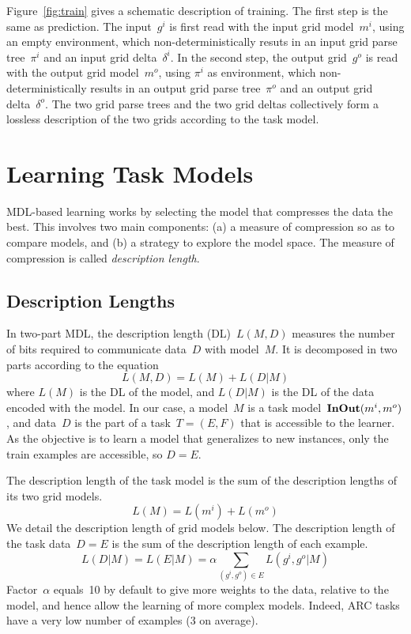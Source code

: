 \documentclass[a4paper]{llncs}
\begin{document}
Figure~\ref{fig:train} gives a schematic description of training. The
first step is the same as prediction. The input~$g^i$ is first read
with the input grid model~$m^i$, using an empty environment, which
non-deterministically resuts in an input grid parse tree~$\pi^i$ and
an input grid delta~$\delta^i$. In the second step, the output
grid~$g^o$ is read with the output grid model~$m^o$, using $\pi^i$ as
environment, which non-deterministically results in an output grid
parse tree~$\pi^o$ and an output grid delta~$\delta^o$.
%
The two grid parse trees and the two grid deltas collectively form a
lossless description of the two grids according to the task model.
 

\section{Learning Task Models}
\label{learning}

MDL-based learning works by selecting the model that compresses the
data the best. This involves two main components: (a) a measure of
compression so as to compare models, and (b) a strategy to explore the
model space. The measure of compression is called {\em description
  length}.

\subsection{Description Lengths}
\label{dl}

In two-part MDL, the description length (DL)~$L(M,D)$ measures the number
of bits required to communicate data~$D$ with model~$M$. It is
decomposed in two parts according to the equation
\[ L(M,D) = L(M) + L(D|M) \] where $L(M)$ is the DL of the model, and
$L(D|M)$ is the DL of the data encoded with the model.
%
In our case, a model~$M$ is a task model~${\bf InOut}(m^i,m^o)$, and
data~$D$ is the part of a task~$T = (E,F)$ that is accessible to
the learner. As the objective is to learn a model that generalizes to
new instances, only the train examples are accessible, so
$D = E$.

The description length of the task model is the sum of the description
lengths of its two grid models.
\[ L(M) = L(m^i) + L(m^o) \]
%
We detail the description length of grid models below. The
description length of the task data~$D = E$ is the sum of the
description length of each example.
\[ L(D|M) = L(E|M) = \alpha \sum_{(g^i,g^o) \in E} L(g^i,g^o|M) \]
%
Factor~$\alpha$ equals~10 by default to give more weights to the data,
relative to the model, and hence allow the learning of more complex
models. Indeed, ARC tasks have a very low number of examples (3 on
average).
\end{document}
